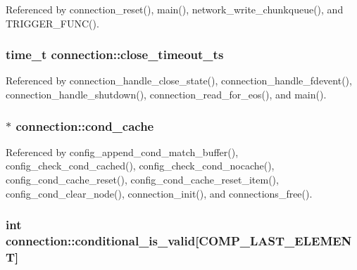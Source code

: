 Referenced by connection\-\_\-reset(), main(), network\-\_\-write\-\_\-chunkqueue(), and T\-R\-I\-G\-G\-E\-R\-\_\-\-F\-U\-N\-C().

\hypertarget{structconnection_a991918bf683703616c8a7f6a3a0eacfa}{
\subsubsection[{close\-\_\-timeout\-\_\-ts}]{\setlength{\rightskip}{0pt plus 5cm}time\-\_\-t connection\-::close\-\_\-timeout\-\_\-ts}}\label{structconnection_a991918bf683703616c8a7f6a3a0eacfa}


Referenced by connection\-\_\-handle\-\_\-close\-\_\-state(), connection\-\_\-handle\-\_\-fdevent(), connection\-\_\-handle\-\_\-shutdown(), connection\-\_\-read\-\_\-for\-\_\-eos(), and main().

\hypertarget{structconnection_a84fcfd608740374ca944491f11bee7c6}{
\subsubsection[{cond\-\_\-cache}]{$\ast$ connection\-::cond\-\_\-cache}}\label{structconnection_a84fcfd608740374ca944491f11bee7c6}


Referenced by config\-\_\-append\-\_\-cond\-\_\-match\-\_\-buffer(), config\-\_\-check\-\_\-cond\-\_\-cached(), config\-\_\-check\-\_\-cond\-\_\-nocache(), config\-\_\-cond\-\_\-cache\-\_\-reset(), config\-\_\-cond\-\_\-cache\-\_\-reset\-\_\-item(), config\-\_\-cond\-\_\-clear\-\_\-node(), connection\-\_\-init(), and connections\-\_\-free().

\hypertarget{structconnection_adb2d47b554fdf1d0e502a98b2bb81661}{
\subsubsection[{conditional\-\_\-is\-\_\-valid}]{\setlength{\rightskip}{0pt plus 5cm}int connection\-::conditional\-\_\-is\-\_\-valid\mbox{[}{\bf C\-O\-M\-P\-\_\-\-L\-A\-S\-T\-\_\-\-E\-L\-E\-M\-E\-N\-T}\mbox{]}}}\label{structconnection_adb2d47b554fdf1d0e502a98b2bb81661}



